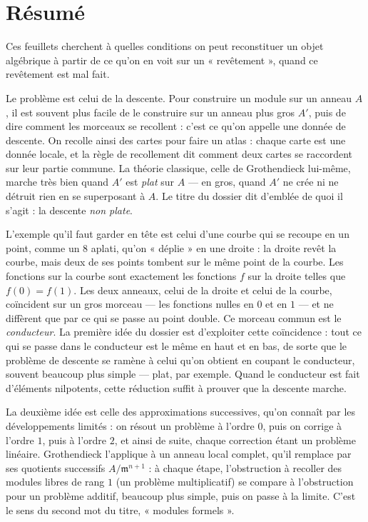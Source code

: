 \documentclass[11pt,a4paper]{article}
\begin{document}
\section*{Résumé}

\begin{resume}
Ces feuillets cherchent à quelles conditions on peut reconstituer un objet
algébrique à partir de ce qu'on en voit sur un « revêtement », quand ce
revêtement est mal fait.

Le problème est celui de la descente. Pour construire un module sur un anneau
$A$, il est souvent plus facile de le construire sur un anneau plus gros $A'$,
puis de dire comment les morceaux se recollent : c'est ce qu'on appelle une
donnée de descente. On recolle ainsi des cartes pour faire un atlas : chaque
carte est une donnée locale, et la règle de recollement dit comment deux
cartes se raccordent sur leur partie commune. La théorie classique, celle
de Grothendieck lui-même, marche très bien quand $A'$ est \emph{plat} sur $A$ — en gros, quand $A'$ ne crée ni ne
détruit rien en se superposant à $A$. Le titre du dossier dit d'emblée de quoi
il s'agit : la descente \emph{non plate}.

L'exemple qu'il faut garder en tête est celui d'une courbe qui se recoupe en
un point, comme un 8 aplati, qu'on « déplie » en une droite : la droite
revêt la courbe, mais deux de ses points tombent sur le même point de la
courbe. Les fonctions sur la courbe sont exactement les fonctions $f$ sur la
droite telles que $f(0) = f(1)$. Les deux anneaux, celui de la droite et
celui de la courbe, coïncident sur un gros morceau — les fonctions nulles en
$0$ et en $1$ — et ne diffèrent que par ce qui se passe au point double. Ce
morceau commun est le \emph{conducteur}. La première idée du dossier est
d'exploiter cette coïncidence : tout ce qui se passe dans le conducteur est
le même en haut et en bas, de sorte que le problème de descente se ramène à
celui qu'on obtient en coupant le conducteur, souvent beaucoup plus simple —
plat, par exemple. Quand le conducteur est fait d'éléments nilpotents, cette
réduction suffit à prouver que la descente marche.

La deuxième idée est celle des approximations successives, qu'on connaît par
les développements limités : on résout un problème à l'ordre $0$, puis on
corrige à l'ordre $1$, puis à l'ordre $2$, et ainsi de suite, chaque
correction étant un problème linéaire. Grothendieck l'applique à un anneau
local complet, qu'il remplace par ses quotients successifs
$A/\mathfrak{m}^{n+1}$ : à chaque étape, l'obstruction à recoller des
modules libres de rang $1$ (un problème multiplicatif) se compare à
l'obstruction pour un problème additif, beaucoup plus simple, puis on passe à
la limite. C'est le sens du second mot du titre, « modules formels ».


\end{resume}
\end{document}
